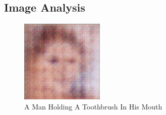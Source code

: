 \documentclass{article}%
\begin{document}
%
\subsection{Image Analysis}%
\label{subsec:ImageAnalysis}%


\begin{figure}[h!]%
\centering%
\includegraphics[width=150px]{500_fake_images/samples_5_170.png}%
\caption{A Man Holding A Toothbrush In His Mouth}%
\end{figure}

%
\end{document}
